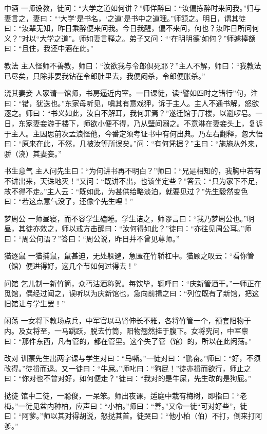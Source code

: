 \documentclass[12pt,UTF8]{ctexbook}
\begin{document}
中酒
一师设教，徒问：“大学之道如何讲？”师佯醉曰：“汝偏拣醉时来问我。”归与妻言之，妻曰：“‘大学’是书名，‘之道’是书中之道理。”师颔之。明日，谓其徒曰：“汝辈无知，昨日乘醉便来问我。今日我醒，偏不来问，何也？汝昨日所问何义？”对以“大学之道”。师如妻言释之。弟子又问：“‘在明明德’如何？”师遽捧额曰：“且住，我还中酒在此。”

教法
主人怪师不善教，师曰：“汝欲我与令郎俱死耶？”主人不解，师曰：“我教法已尽矣，只除非要我钻在令郎肚里去，我便闷杀，令郎便胀杀。”

浇其妻妾
人家请一馆师，书房逼近内室。一日课徒，读“譬如四时之错行”句，注曰：“错，犹迭也。”东家母听见，嗔其有意戏狎，诉于主人。主人不通书解，怒欲逐之。师曰：“书义如此，汝自不解耳，我何罪焉？”遂迁馆于厅楼，以避啰皂。一日，东家妻妾游于楼下，师欲小便不得，乃从壁间溺之。不意淋在妻妾头上，复诉于主人。主因思前次孟浪怪他，今番定须考证书中有何出典。乃左右翻释，忽大悟曰：“原来在此，不然，几被汝等所误矣。”问：“有何凭据？”主曰：“施施从外来，骄（浇）其妻妾。”

书生意气
主人问先生曰：“为何讲书再不明白？”师曰：“兄是相知的，我胸中若有不讲出来，天诛地灭！”又问：“既讲不出，也该坐定些？”答云：“只为家下不足，故不得不走。”主人云：“既如此，为甚供给略淡泊，就要见过？”先生毅然变色曰：“若这点意气没了，还像个先生哩！”

梦周公
一师昼寝，而不容学生磕睡。学生诘之，师谬言曰：“我乃梦周公也。”明昼，其徒亦效之，师以戒方击醒曰：“汝何得如此？”徒曰：“亦往见周公耳。”师曰：“周公何语？”答曰：“周公说，昨日并不曾见尊师。”

猫逐鼠
一猫捕鼠，鼠甚迫，无处躲避，急匿在竹轿杠中。猫顾之叹云：“看你管（馆）便进得好，这几个节如何过得去！”

问馆
乞儿制一新竹筒，众丐沽酒称贺。每饮毕，辄呼曰：“庆新管酒干。”一师正在觅馆，偶经过闻之，误听以为庆新馆也，急向前揖之曰：“列位既有了新馆，把这旧馆让与学生罢！”

闲荡
一女将下教场点兵，中军官以马肾伸长不雅，各将竹管一个，预套阳物于内。及女将至，一马跳跃，脱去竹筒，阳物翘然挂于腹下。女将究问，中军禀曰：“那件东西，凡有管的，都在管里。这个失了管（馆）的，所以在此闲荡。”

改对
训蒙先生出两字课与学生对曰：“马嘶。”一徒对曰：“鹏奋。”师曰：“好，不须改得。”徒揖而退。又一徒曰：“牛屎。”师叱曰：“狗屁！”徒亦揖而欲行，师止之曰：“你对也不曾对好，如何便走？”徒曰：“我对的是牛屎，先生改的是狗屁。”

挞徒
馆中二徒，一聪俊，一呆笨。师出夜课，适庭中栽有梅树，即指曰：“老梅。”一徒见盆内种柏，应声曰：“小柏。”师曰：“善。”又命一徒“可对好些”，徒曰：“阿爹。”师以其对得胡说，怒挞其首。徒哭曰：“他小柏（伯）不打，倒来打阿爹。”
\end{document}

